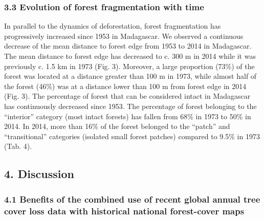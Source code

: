 \documentclass[]{article}
\begin{document}
\hypertarget{evolution-of-forest-fragmentation-with-time}{%
\subsubsection{3.3 Evolution of forest fragmentation with
time}\label{evolution-of-forest-fragmentation-with-time}}

In parallel to the dynamics of deforestation, forest fragmentation has
progressively increased since 1953 in Madagascar. We observed a
continuous decrease of the mean distance to forest edge from 1953 to
2014 in Madagascar. The mean distance to forest edge has decreased to c.
300 m in 2014 while it was previously c. 1.5 km in 1973 (Fig. 3).
Moreover, a large proportion (73\%) of the forest was located at a
distance greater than 100 m in 1973, while almost half of the forest
(46\%) was at a distance lower than 100 m from forest edge in 2014 (Fig.
3). The percentage of forest that can be considered intact in Madagascar
has continuously decreased since 1953. The percentage of forest
belonging to the ``interior'' category (most intact forests) has fallen
from 68\% in 1973 to 50\% in 2014. In 2014, more than 16\% of the forest
belonged to the ``patch'' and ``transitional'' categories (isolated
small forest patches) compared to 9.5\% in 1973 (Tab. 4).

\hypertarget{discussion}{%
\subsection{4. Discussion}\label{discussion}}

\hypertarget{benefits-of-the-combined-use-of-recent-global-annual-tree-cover-loss-data-with-historical-national-forest-cover-maps}{%
\subsubsection{4.1 Benefits of the combined use of recent global annual
tree cover loss data with historical national forest-cover
maps}\label{benefits-of-the-combined-use-of-recent-global-annual-tree-cover-loss-data-with-historical-national-forest-cover-maps}}
\end{document}
